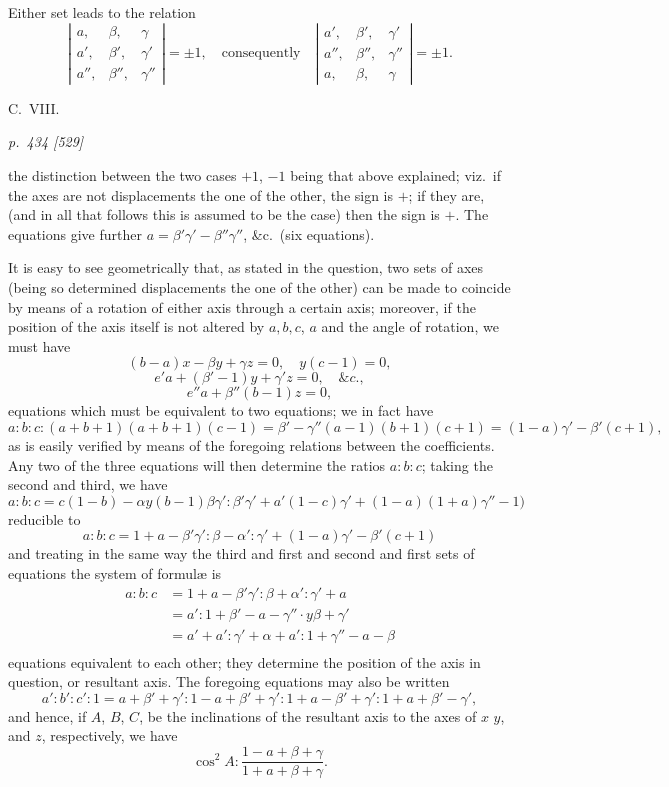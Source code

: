 \documentclass[11pt,a4paper]{book}
\begin{document}
Either set leads to the relation
\[
\left|\begin{array}{ccc}a,&\beta,&\gamma\\a',&\beta',&\gamma'\\a'',&\beta'',&\gamma''\end{array}\right|= \pm 1,\quad\text{consequently}\quad \left|\begin{array}{ccc}a',&\beta',&\gamma'\\a'',&\beta'',&\gamma''\\a,&\beta,&\gamma\end{array}\right| = \pm 1.
\]

\bigskip
\hfill{\small C.\ VIII.}

\clearpage

\bigskip
\textit{p.~434 [529]}
\smallskip

the distinction between the two cases $+ 1$, $- 1$ being that above explained; viz.\ if
the axes are not displacements the one of the other, the sign is $+$; if they are,
(and in all that follows this is assumed to be the case) then the sign is $+$. The
equations give further $a = \beta'\gamma' - \beta''\gamma''$, \&c.\ (six equations).

It is easy to see geometrically that, as stated in the question, two sets of axes
(being so determined displacements the one of the other) can be made to coincide by
means of a rotation of either axis through a certain axis; moreover, if the
position of the axis itself is not altered by $a, b, c$, $a$ and the angle of rotation, we
must have
\[
(b - a)x - \beta y + \gamma z = 0,\quad y(c - 1) = 0,
\]
\[
e'a + (\beta' - 1)y + \gamma' z = 0,\quad \&c.,
\]
\[
e''a + \beta''(b - 1)z = 0,
\]
equations which must be equivalent to two equations; we in fact have
\[
a:b:c:(a + b + 1)(a + b + 1)(c - 1) = \beta' - \gamma''(a - 1)(b + 1)(c + 1) = (1 - a)\gamma' - \beta'(c + 1),
\]
as is easily verified by means of the foregoing relations between the coefficients.
Any two of the three equations will then determine the ratios $a:b:c$; taking the
second and third, we have
\[
a:b:c = c(1 - b) - \alpha y(b - 1)\beta\gamma':\beta'\gamma' + a'(1 - c)\gamma' + (1 - a)(1 + a)\gamma'' - 1)
\]
reducible to
\[
a:b:c = 1 + a - \beta'\gamma':\beta - \alpha':\gamma' + (1 - a)\gamma' - \beta'(c + 1)
\]
and treating in the same way the third and first and second and first sets of equations
the system of formul\ae{} is
\begin{align*}
a:b:c &= 1 + a - \beta'\gamma':\beta + \alpha':\gamma' + a\\
&= a':1 + \beta' - a - \gamma'' \cdot y\beta + \gamma'\\
&= a' + a':\gamma' + \alpha + a':1 + \gamma'' - a - \beta\\
\end{align*}
equations equivalent to each other; they determine the position of the axis in question,
or resultant axis. The foregoing equations may also be written
\[
a':b':c':1 = a + \beta' + \gamma':1 - a + \beta' + \gamma':1 + a - \beta' + \gamma':1 + a + \beta' - \gamma',
\]
and hence, if $A$, $B$, $C$, be the inclinations of the resultant axis to the axes of $x$
$y$, and $z$, respectively, we have
\[
\cos^2 A : \frac{1 - a + \beta + \gamma}{1 + a + \beta + \gamma}.
\]
\end{document}
